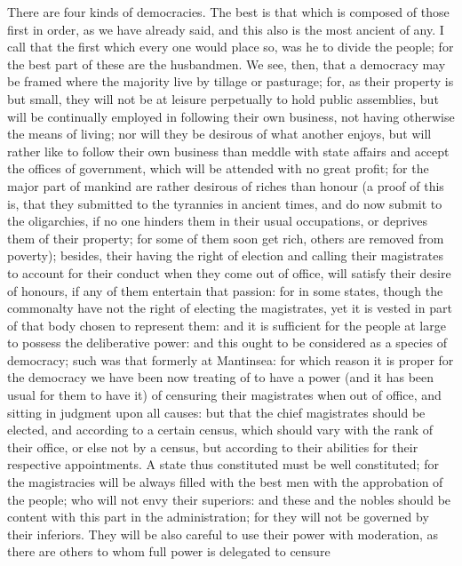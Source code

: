 
There are four kinds of democracies. The best is that which is composed of
those first in order, as we have already said, and this also is the most
ancient of any. I call that the first which every one would place so, was
he to divide the people; for the best part of these are the husbandmen. We
see, then, that a democracy may be framed where the majority live by
tillage or pasturage; for, as their property is but small, they will not
be at leisure perpetually to hold public assemblies, but will be
continually employed in following their own business, not having otherwise
the means of living; nor will they be desirous of what another enjoys, but
will rather like to follow their own business than meddle with state
affairs and accept the offices of government, which will be attended with
no great profit; for the major part of mankind are rather desirous of
riches than honour (a proof of this is, that they submitted to the
tyrannies in ancient times, and do now submit to the oligarchies, if no
one hinders them in their usual occupations, or deprives them of their
property; for some of them soon get rich, others are removed from
poverty); besides, their having the right of election and calling their
magistrates to account for their conduct when they come out of office,
will satisfy their desire of honours, if any of them entertain that
passion: for in some states, though the commonalty have not the right of
electing the magistrates, yet it is vested in part of that body chosen to
represent them: and it is sufficient for the people at large to possess
the deliberative power: and this ought to be considered as a species of
democracy; such was that formerly at Mantinsea: for which reason it is
proper for the democracy we have been now treating of to have a power (and
it has been usual for them to have it) of censuring their magistrates when
out of office, and sitting in judgment upon all causes: but that the chief
magistrates should be elected, and according to a certain census, which
should vary with the rank of their office, or else not by a census, but
according to their abilities for their respective appointments. A state
thus constituted must be well constituted; for the magistracies will be
always filled with the best men with the approbation of the people; who
will not envy their superiors: and these and the nobles should be content
with this part in the administration; for they will not be governed by
their inferiors. They will be also careful to use their power with
moderation, as there are others to whom full power is delegated to censure
